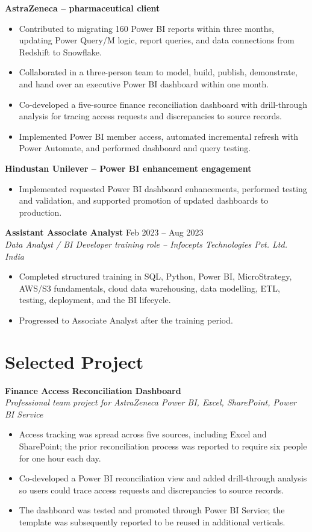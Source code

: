 \documentclass[a4paper,10pt]{article}
\newcommand{\roleheading}[4]{%
  \textbf{#1} \hfill #2\\
  \textit{#3} \hfill \textit{#4}\vspace{3pt}
}
\newcommand{\clientheading}[1]{\textbf{#1}\vspace{1pt}}
\newenvironment{resumeitems}{\begin{itemize}}{\end{itemize}}
\newcommand{\SelectedProjectTitle}{Finance Access Reconciliation Dashboard}
\newcommand{\SelectedProjectContext}{Professional team project for AstraZeneca \textbar{} Power BI, Excel, SharePoint, Power BI Service}
\newcommand{\SelectedProjectBulletOne}{Access tracking was spread across five sources, including Excel and SharePoint; the prior reconciliation process was reported to require six people for one hour each day.}
\newcommand{\SelectedProjectBulletTwo}{Co-developed a Power BI reconciliation view and added drill-through analysis so users could trace access requests and discrepancies to source records.}
\newcommand{\SelectedProjectBulletThree}{The dashboard was tested and promoted through Power BI Service; the template was subsequently reported to be reused in additional verticals.}
\begin{document}
\clientheading{AstraZeneca -- pharmaceutical client}
\begin{resumeitems}
  \item Contributed to migrating 160 Power BI reports within three months, updating Power Query/M logic, report queries, and data connections from Redshift to Snowflake.
  \item Collaborated in a three-person team to model, build, publish, demonstrate, and hand over an executive Power BI dashboard within one month.
  \item Co-developed a five-source finance reconciliation dashboard with drill-through analysis for tracing access requests and discrepancies to source records.
  \item Implemented Power BI member access, automated incremental refresh with Power Automate, and performed dashboard and query testing.
\end{resumeitems}

\clientheading{Hindustan Unilever -- Power BI enhancement engagement}
\begin{resumeitems}
  \item Implemented requested Power BI dashboard enhancements, performed testing and validation, and supported promotion of updated dashboards to production.
\end{resumeitems}

\roleheading{Assistant Associate Analyst}{Feb 2023 -- Aug 2023}{Data Analyst / BI Developer training role -- Infocepts Technologies Pvt. Ltd.}{India}
\begin{resumeitems}
  \item Completed structured training in SQL, Python, Power BI, MicroStrategy, AWS/S3 fundamentals, cloud data warehousing, data modelling, ETL, testing, deployment, and the BI lifecycle.
  \item Progressed to Associate Analyst after the training period.
\end{resumeitems}

\newpage

\section{Selected Project}
\textbf{\SelectedProjectTitle}\\
\textit{\SelectedProjectContext}
\begin{resumeitems}
  \item \SelectedProjectBulletOne
  \item \SelectedProjectBulletTwo
  \item \SelectedProjectBulletThree
\end{resumeitems}
\end{document}
